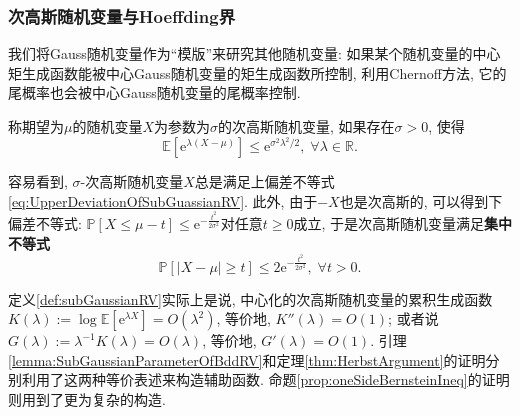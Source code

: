 \subsubsection{次高斯随机变量与Hoeffding界}

我们将Gauss随机变量作为“模版”来研究其他随机变量: 如果某个随机变量的中心矩生成函数能被中心Gauss随机变量的矩生成函数所控制, 利用Chernoff方法, 它的尾概率也会被中心Gauss随机变量的尾概率控制. 

\begin{definition}[次高斯随机变量]\label{def:subGaussianRV}
	称期望为$\mu$的随机变量$X$为参数为$\sigma$的次高斯随机变量, 如果存在$\sigma > 0$, 使得
	\begin{equation*}
		\mathbb{E}[\mathrm{e}^{\lambda(X - \mu)}] \leq \mathrm{e}^{\sigma^2 \lambda^2 /2},\; \forall \lambda \in \mathbb{R}.   
	\end{equation*}  
\end{definition}
容易看到, $\sigma$-次高斯随机变量$X$总是满足上偏差不等式 \eqref{eq:UpperDeviationOfSubGuassianRV}.  
此外, 由于$-X$也是次高斯的, 可以得到下偏差不等式: $\mathbb{P}[X \leq \mu - t] \leq \mathrm{e}^{- \frac{t^2}{2 \sigma^2}}$对任意$t \geq 0$成立, 于是次高斯随机变量满足\textbf{集中不等式}
\begin{equation}\label{eq:SubGuassianConcentration}
	\mathbb{P}[|X - \mu| \geq t] \leq 2 \mathrm{e}^{- \frac{t^2}{2 \sigma^2}},\; \forall t > 0. 
\end{equation}

\begin{remark}[辅助函数的构造]
	定义\ref{def:subGaussianRV}实际上是说, 中心化的次高斯随机变量的累积生成函数$K(\lambda) := \log \mathbb{E}[\mathrm{e}^{\lambda X}] = O(\lambda^2)$, 等价地, $K''(\lambda) = O(1)$; 
	或者说$G(\lambda) := \lambda^{-1} K(\lambda) = O(\lambda)$, 等价地, $G'(\lambda) = O(1)$. 
	引理\ref{lemma:SubGaussianParameterOfBddRV}和定理\ref{thm:HerbstArgument}的证明分别利用了这两种等价表述来构造辅助函数.
	命题\ref{prop:oneSideBernsteinIneq}的证明则用到了更为复杂的构造.  
\end{remark}

